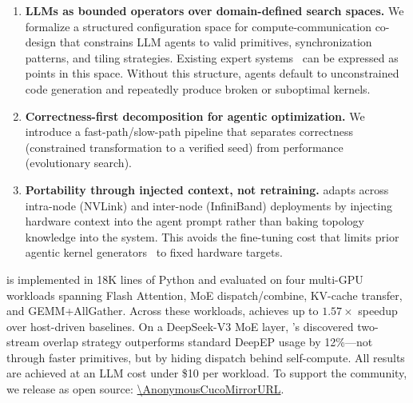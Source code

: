 \begin{enumerate}[leftmargin=1.4em,itemsep=1pt,topsep=2pt]
  \item \textbf{LLMs as bounded operators over domain-defined search spaces.} We formalize a structured configuration space for compute-communication co-design that constrains LLM agents to valid primitives, synchronization patterns, and tiling strategies. Existing expert systems~\cite{deepep2025, chang2024flux} can be expressed as points in this space. Without this structure, agents default to unconstrained code generation and repeatedly produce broken or suboptimal kernels.
  \item \textbf{Correctness-first decomposition for agentic optimization.} We introduce a fast-path/slow-path pipeline that separates correctness (constrained transformation to a verified seed) from performance (evolutionary search).
  \item \textbf{Portability through injected context, not retraining.} \cufuse{} adapts across intra-node (NVLink) and inter-node (InfiniBand) deployments by injecting hardware context into the agent prompt rather than baking topology knowledge into the system. This avoids the fine-tuning cost that limits prior agentic kernel generators~\cite{kevin} to fixed hardware targets.
\end{enumerate}

\cufuse{} is implemented in 18K lines of Python and evaluated on four multi-GPU workloads spanning Flash Attention, MoE dispatch/combine, KV-cache transfer, and GEMM+AllGather. Across these workloads, \cufuse{} achieves up to $1.57\times$ speedup over host-driven baselines. On a DeepSeek-V3 MoE layer, \cufuse{}'s discovered two-stream overlap strategy outperforms standard DeepEP usage by 12\%---not through faster primitives, but by hiding dispatch behind self-compute. All results are achieved at an LLM cost under \$10 per workload. To support the community, we release \cufuse{} as open source: \url{\AnonymousCucoMirrorURL}.

